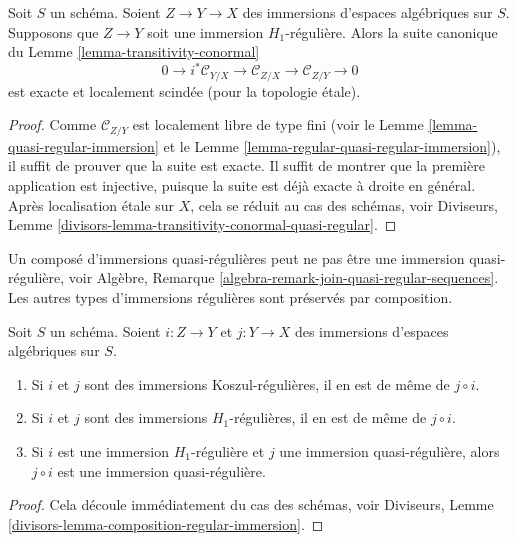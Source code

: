 \begin{lemma}
\label{lemma-transitivity-conormal-quasi-regular}
Soit $S$ un schéma. Soient $Z \to Y \to X$ des immersions d'espaces algébriques
sur $S$. Supposons que $Z \to Y$ soit une immersion $H_1$-régulière. Alors la suite canonique
du Lemme \ref{lemma-transitivity-conormal}
$$
0 \to i^*\mathcal{C}_{Y/X} \to
\mathcal{C}_{Z/X} \to
\mathcal{C}_{Z/Y} \to 0
$$
est exacte et localement scindée (pour la topologie étale).
\end{lemma}

\begin{proof}
Comme $\mathcal{C}_{Z/Y}$ est localement libre de type fini (voir le
Lemme \ref{lemma-quasi-regular-immersion}
et le
Lemme \ref{lemma-regular-quasi-regular-immersion}),
il suffit de prouver que la suite est exacte.
Il suffit de montrer que la première application est injective,
puisque la suite est déjà exacte à droite en général.
Après localisation étale sur $X$, cela se réduit au cas
des schémas, voir
Diviseurs, Lemme \ref{divisors-lemma-transitivity-conormal-quasi-regular}.
\end{proof}

\noindent
Un composé d'immersions quasi-régulières peut ne pas être une immersion quasi-régulière, voir
Algèbre, Remarque \ref{algebra-remark-join-quasi-regular-sequences}.
Les autres types d'immersions régulières sont préservés par composition.

\begin{lemma}
\label{lemma-composition-regular-immersion}
Soit $S$ un schéma. Soient $i : Z \to Y$ et $j : Y \to X$ des immersions
d'espaces algébriques sur $S$.
\begin{enumerate}
\item Si $i$ et $j$ sont des immersions Koszul-régulières, il en est de même de $j \circ i$.
\item Si $i$ et $j$ sont des immersions $H_1$-régulières, il en est de même de $j \circ i$.
\item Si $i$ est une immersion $H_1$-régulière et $j$ une immersion
quasi-régulière, alors $j \circ i$ est une immersion quasi-régulière.
\end{enumerate}
\end{lemma}

\begin{proof}
Cela découle immédiatement du cas des schémas, voir
Diviseurs, Lemme \ref{divisors-lemma-composition-regular-immersion}.
\end{proof}

